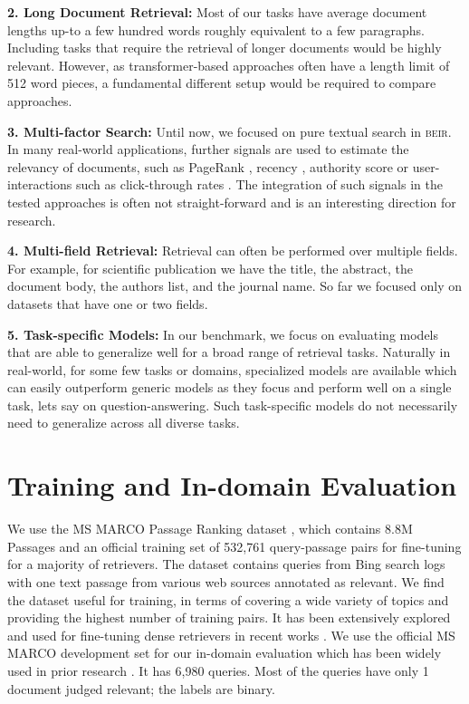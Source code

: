 \documentclass{article}
\newcommand{\custo}[1]{\textsc{\normalsize #1}}
\newcommand{\beir}{\custo{beir}\xspace}
\begin{document}
\textbf{2. Long Document Retrieval:} Most of our tasks have average document lengths up-to a few hundred words roughly equivalent to a few paragraphs. Including tasks that require the retrieval of longer documents would be highly relevant. However, as transformer-based approaches often have a length limit of 512 word pieces, a fundamental different setup would be required to compare approaches.

\textbf{3. Multi-factor Search:} Until now, we focused on pure textual search in \beir. In many real-world applications, further signals are used to estimate the relevancy of documents, such as PageRank \cite{ilprints422}, recency \cite{10.1145/1772690.1772725}, authority score \cite{10.1145/324133.324140} or user-interactions such as click-through rates \cite{10.1145/1458082.1458092}. The integration of such signals in the tested approaches is often not straight-forward and is an interesting direction for research.

\textbf{4. Multi-field Retrieval:} Retrieval can often be performed over multiple fields. For example, for scientific publication we have the title, the abstract, the document body, the authors list, and the journal name. So far we focused only on datasets that have one or two fields.

\textbf{5. Task-specific Models:} In our benchmark, we focus on evaluating models that are able to generalize well for a broad range of retrieval tasks. Naturally in real-world, for some few tasks or domains, specialized models are available which can easily outperform generic models as they focus and perform well on a single task, lets say on question-answering. Such task-specific models do not necessarily need to generalize across all diverse tasks.


\vspace{-3mm}
\section{Training and In-domain Evaluation}\label{sec:training_dataset}
\vspace{-2mm}


We use the MS MARCO Passage Ranking dataset \cite{nguyen2016ms}, which contains 8.8M Passages and an official training set of 532,761 query-passage pairs for fine-tuning for a majority of retrievers. The dataset contains queries from Bing search logs with one text passage from various web sources annotated as relevant. We find the dataset useful for training, in terms of covering a wide variety of topics and providing the highest number of training pairs. It has been extensively explored and used for fine-tuning dense retrievers in recent works \cite{nogueira2020passage,gao2020complementing,ding2020rocketqa}. We use the official MS MARCO development set for our in-domain evaluation
which has been widely used in prior research \cite{nogueira2020passage, gao2020complementing,ding2020rocketqa}. It has 6,980 queries. Most of the queries have only 1 document judged relevant; the labels are binary.
\end{document}
